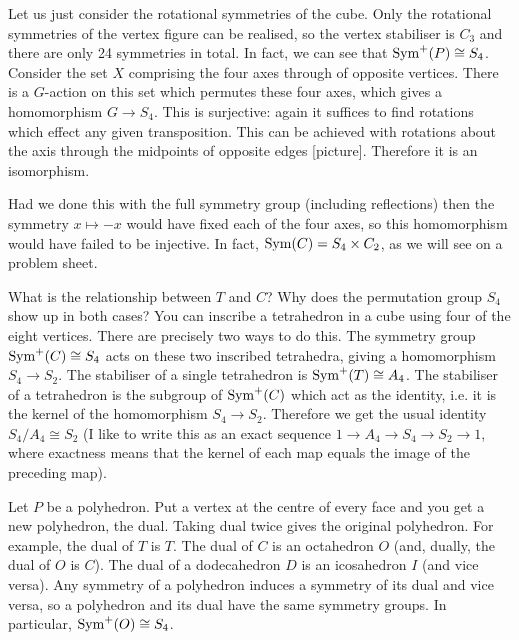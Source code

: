 \documentclass[12pt]{article}
\begin{document}
\begin{exm}
  Let us just consider the rotational symmetries of the cube. Only the rotational symmetries of the vertex figure can be realised, so the vertex stabiliser is $C_3$ and there are only 24 symmetries in total. In fact, we can see that $\operatorname{Sym}^+(P)\cong S_4$. Consider the set $X$ comprising the four axes through of opposite vertices. There is a $G$-action on this set which permutes these four axes, which gives a homomorphism $G\to S_4$. This is surjective: again it suffices to find rotations which effect any given transposition. This can be achieved with rotations about the axis through the midpoints of opposite edges [picture]. Therefore it is an isomorphism.

  Had we done this with the full symmetry group (including reflections) then the symmetry $x\mapsto -x$ would have fixed each of the four axes, so this homomorphism would have failed to be injective. In fact, $\operatorname{Sym}(C)=S_4\times C_2$, as we will see on a problem sheet.
\end{exm}

\begin{rmk}
What is the relationship between $T$ and $C$? Why does the permutation group $S_4$ show up in both cases? You can inscribe a tetrahedron in a cube using four of the eight vertices. There are precisely two ways to do this. The symmetry group $\operatorname{Sym}^+(C)\cong S_4$ acts on these two inscribed tetrahedra, giving a homomorphism $S_4\to S_2$. The stabiliser of a single tetrahedron is $\operatorname{Sym}^+(T)\cong A_4$. The stabiliser of a tetrahedron is the subgroup of $\operatorname{Sym}^+(C)$ which act as the identity, i.e. it is the kernel of the homomorphism $S_4\to S_2$. Therefore we get the usual identity $S_4/A_4\cong S_2$ (I like to write this as an exact sequence $1\to A_4\to S_4\to S_2\to 1$, where exactness means that the kernel of each map equals the image of the preceding map).
\end{rmk}

\begin{dfn}
Let $P$ be a polyhedron. Put a vertex at the centre of every face and you get a new polyhedron, the dual. Taking dual twice gives the original polyhedron. For example, the dual of $T$ is $T$. The dual of $C$ is an octahedron $O$ (and, dually, the dual of $O$ is $C$). The dual of a dodecahedron $D$ is an icosahedron $I$ (and vice versa). Any symmetry of a polyhedron induces a symmetry of its dual and vice versa, so a polyhedron and its dual have the same symmetry groups. In particular, $\operatorname{Sym}^+(O)\cong S_4$.
\end{dfn}
\end{document}
